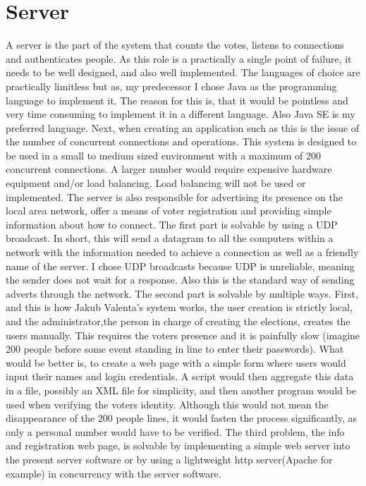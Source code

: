 \documentclass[11pt,twoside,a4paper]{book}
\begin{document}
\section{Server}
A server is the part of the system that counts the votes, listens to connections and authenticates people. As this role is a practically a single point of failure, it needs to be well designed, and also well implemented. The languages of choice are practically limitless but as, my predecessor I chose Java as the programming language to implement it. The reason for this is, that it would be pointless and very time consuming to implement it in a different language. Also Java SE is my preferred language. Next, when creating an application such as this is the issue of the number of concurrent connections and operations. This system is designed to be used in a small to medium sized environment with  a maximum of 200 concurrent connections. A larger number would require expensive hardware equipment and/or load balancing. Load balancing will not be used or implemented. The server is also responsible for advertising its presence on the local area network, offer a means of voter registration and providing simple information about how to connect. The first part is solvable by using a UDP\cite{whatIsUPD} broadcast\cite{whatIsBroadcasting}. In short, this will send a datagram to all the computers within a network with the information needed to achieve a connection as well as a friendly name of the server. I chose UDP broadcasts because UDP is unreliable, meaning the sender does not wait for a response. Also this is the standard way of sending adverts through the network. The second part is solvable by multiple ways. First, and this is how Jakub Valenta's system works, the user creation is strictly local, and the administrator,the person in charge of creating the elections, creates the users manually. This requires the voters presence and  it is painfully slow (imagine 200 people before some event standing in line to enter their passwords). What would be better is, to create a web page with a simple form where users would input their names and login credentials. A script would then aggregate this data in a file, possibly an XML file for simplicity, and then another program would be used when verifying the voters identity. Although this would not mean the disappearance of the 200 people lines, it would fasten the process significantly, as only a personal number would have to be verified. The third problem, the info and registration web page, is solvable by implementing a simple web server into the present server software or by using a lightweight http server(Apache for example)  in concurrency with the server software.
\end{document}
